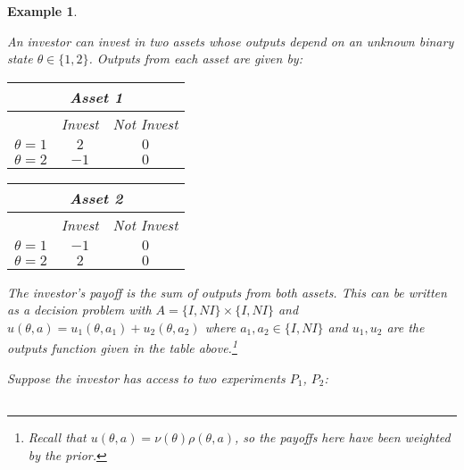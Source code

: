 \documentclass[11pt]{article}
\theoremstyle{plain}
\newtheorem{ex}{Example}
\theoremstyle{remark}
\begin{document}
\begin{ex}\label{ex-portfolio}


An investor can invest in two assets whose outputs depend on an unknown binary state $\theta\in\{1,2\}$. Outputs from each asset are given by:


\vspace{0.1in}
\hspace{0.5in}\begin{tabular}{  |c | c |c|}
           
           \multicolumn{3}{c}{Asset 1}      \\\hline
           &  Invest & Not Invest\\ \hline
          $\theta=1$ & $2$ & $0$\\ \hline
          $\theta=2$ & $-1$ & $0$\\ \hline
\end{tabular}
\hfill
\begin{tabular}{  |c | c |c|}
           \multicolumn{3}{c}{Asset 2}      \\\hline
           &  Invest & Not Invest\\ \hline
          $\theta=1$ & $-1$ & $0$\\ \hline
          $\theta=2$ & $2$ & $0$\\ \hline
\end{tabular}
\hspace{0.5in}
\vspace{0.2in}

\noindent The investor's payoff is the sum of outputs from both assets. This can be written as a decision problem with $A=\{I,NI\}\times \{I,NI\}$ and $u(\theta,a)=u_1(\theta,a_1)+u_2(\theta,a_2)$ where $a_1,a_2\in\{I,NI\}$ and $u_1,u_2$ are the outputs function given in the table above.\footnote{Recall that $u(\theta,a)=\nu(\theta)\rho(\theta,a)$, so the payoffs here have been weighted by the prior.}

Suppose the investor has access to two experiments $P_1$, $P_2$: 


\vspace{0.1in}
\hspace{0.5in}\begin{tabular}{  |c | c |c|}
           

\end{tabular}
\end{ex}
\end{document}

